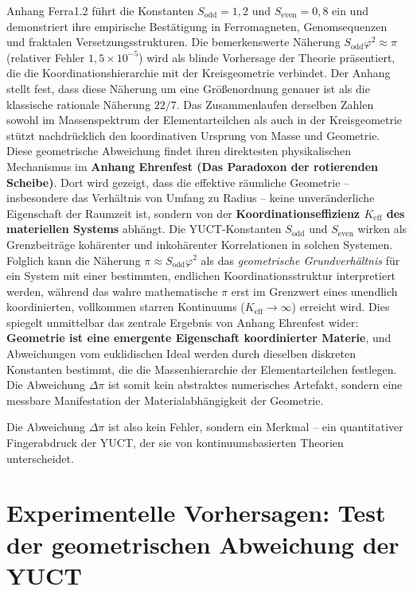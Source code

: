 \documentclass[12pt,a4paper]{article}
\begin{document}
	Anhang Ferra1.2 führt die Konstanten \(S_{\mathrm{odd}}=1{,}2\) und \(S_{\mathrm{even}}=0{,}8\) ein und demonstriert ihre empirische Bestätigung in Ferromagneten, Genomsequenzen und fraktalen Versetzungsstrukturen. Die bemerkenswerte Näherung \(S_{\mathrm{odd}}\varphi^2 \approx \pi\) (relativer Fehler \(1{,}5\times10^{-5}\)) wird als blinde Vorhersage der Theorie präsentiert, die die Koordinationshierarchie mit der Kreisgeometrie verbindet. Der Anhang stellt fest, dass diese Näherung um eine Größenordnung genauer ist als die klassische rationale Näherung \(22/7\). Das Zusammenlaufen derselben Zahlen sowohl im Massenspektrum der Elementarteilchen als auch in der Kreisgeometrie stützt nachdrücklich den koordinativen Ursprung von Masse und Geometrie. Diese geometrische Abweichung findet ihren direktesten physikalischen Mechanismus im \textbf{Anhang Ehrenfest (Das Paradoxon der rotierenden Scheibe)}. Dort wird gezeigt, dass die effektive räumliche Geometrie – insbesondere das Verhältnis von Umfang zu Radius – keine unveränderliche Eigenschaft der Raumzeit ist, sondern von der \textbf{Koordinationseffizienz \(K_{\mathrm{eff}}\) des materiellen Systems} abhängt. Die YUCT-Konstanten \(S_{\mathrm{odd}}\) und \(S_{\mathrm{even}}\) wirken als Grenzbeiträge kohärenter und inkohärenter Korrelationen in solchen Systemen. Folglich kann die Näherung \(\pi \approx S_{\mathrm{odd}}\varphi^2\) als das \textit{geometrische Grundverhältnis} für ein System mit einer bestimmten, endlichen Koordinationsstruktur interpretiert werden, während das wahre mathematische \(\pi\) erst im Grenzwert eines unendlich koordinierten, vollkommen starren Kontinuums (\(K_{\mathrm{eff}} \to \infty\)) erreicht wird. Dies spiegelt unmittelbar das zentrale Ergebnis von Anhang Ehrenfest wider: \textbf{Geometrie ist eine emergente Eigenschaft koordinierter Materie}, und Abweichungen vom euklidischen Ideal werden durch dieselben diskreten Konstanten bestimmt, die die Massenhierarchie der Elementarteilchen festlegen. Die Abweichung \(\Delta\pi\) ist somit kein abstraktes numerisches Artefakt, sondern eine messbare Manifestation der Materialabhängigkeit der Geometrie.
	
	Die Abweichung \(\Delta\pi\) ist also kein Fehler, sondern ein Merkmal – ein quantitativer Fingerabdruck der YUCT, der sie von kontinuumsbasierten Theorien unterscheidet.
	
	\section{Experimentelle Vorhersagen: Test der geometrischen Abweichung der YUCT}
	
\end{document}
